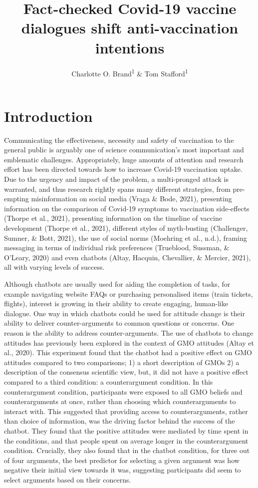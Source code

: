 \documentclass[
  english,
  ,jou,floatsintext]{apa6}
\title{Fact-checked Covid-19 vaccine dialogues shift anti-vaccination intentions}
\author{Charlotte O. Brand\textsuperscript{1} \& Tom Stafford\textsuperscript{1}}
\date{}
\affiliation{\vspace{0.5cm}\textsuperscript{1} University of Sheffield, Department of Psychology}
\begin{document}
\maketitle

\hypertarget{introduction}{%
\section{Introduction}\label{introduction}}

Communicating the effectiveness, necessity and safety of vaccination to the general public is arguably one of science communication's most important and emblematic challenges. Appropriately, huge amounts of attention and research effort has been directed towards how to increase Covid-19 vaccination uptake. Due to the urgency and impact of the problem, a multi-pronged attack is warranted, and thus research rightly spans many different strategies, from pre-empting misinformation on social media (Vraga \& Bode, 2021), presenting information on the comparison of Covid-19 symptoms to vaccination side-effects (Thorpe et al., 2021), presenting information on the timeline of vaccine development (Thorpe et al., 2021), different styles of myth-busting (Challenger, Sumner, \& Bott, 2021), the use of social norms (Moehring et al., n.d.), framing messaging in terms of individual risk preferences (Trueblood, Sussman, \& O'Leary, 2020) and even chatbots (Altay, Hacquin, Chevallier, \& Mercier, 2021), all with varying levels of success.

Although chatbots are usually used for aiding the completion of tasks, for example navigating website FAQs or purchasing personalised items (train tickets, flights), interest is growing in their ability to create engaging, human-like dialogue. One way in which chatbots could be used for attitude change is their ability to deliver counter-arguments to common questions or concerns. One reason is the ability to address counter-arguments. The use of chatbots to change attitudes has previously been explored in the context of GMO attitudes (Altay et al., 2020). This experiment found that the chatbot had a positive effect on GMO attitudes compared to two comparisons; 1) a short description of GMOs 2) a description of the consensus scientific view, but, it did not have a positive effect compared to a third condition: a counterargument condition. In this counterargument condition, participants were exposed to all GMO beliefs and counterarguments at once, rather than choosing which counterarguments to interact with. This suggested that providing access to counterarguments, rather than choice of information, was the driving factor behind the success of the chatbot. They found that the positive attitudes were mediated by time spent in the conditions, and that people spent on average longer in the counterargument condition. Crucially, they also found that in the chatbot condition, for three out of four arguments, the best predictor for selecting a given argument was how negative their initial view towards it was, suggesting participants did seem to select arguments based on their concerns.
\end{document}
